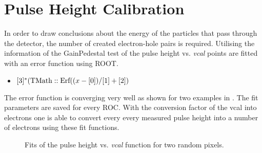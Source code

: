 \section{Pulse Height Calibration}\label{spulseheight}
In order to draw conclusions about the energy of the particles that pass through the detector, the number of created electron-hole pairs is required. Utilising the information of the GainPedestal test of  the pulse height vs. \textit{vcal} points are fitted with an error function using ROOT.
\begin{itemize}
	\item[] $[3]^{*}(\text{TMath}::\text{Erf}((x-[0])/[1]+[2])$
\end{itemize}
The error function is converging very well as shown for two examples in . The fit parameters are saved for every \ac{ROC}. With the conversion factor of the vcal into electrons one is able to convert every every measured pulse height into a number of electrons using these fit functions.
\begin{figure}[ht]
	\centering
	\hfill
	\caption{Fits of the pulse height vs. \textit{vcal} function for two random pixels.}
	\label{perrfit}
\end{figure}\no
